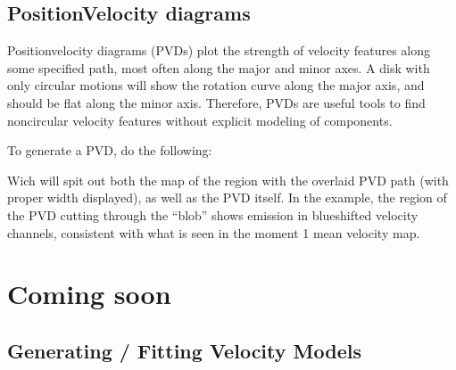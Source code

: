 \documentclass[letterpaper,10pt,english]{sphinxmanual}
\let\sphinxpxdimen\pdfpxdimen\else\newdimen\sphinxpxdimen
\begin{document}
\sphinxstepscope


\section{Position\sphinxhyphen{}Velocity diagrams}
\label{\detokenize{pvds:position-velocity-diagrams}}\label{\detokenize{pvds::doc}}
\sphinxAtStartPar
Position\sphinxhyphen{}velocity diagrams (PVDs) plot the strength of velocity features along some specified path, most often
along the major and minor axes. A disk with only circular motions will show the rotation curve along the
major axis, and should be flat along the minor axis. Therefore, PVDs are useful tools to find non\sphinxhyphen{}circular
velocity features without explicit modeling of components.

\sphinxAtStartPar
To generate a PVD, do the following:

\begin{sphinxVerbatim}[commandchars=\\\{\}]
       
  
\end{sphinxVerbatim}

\sphinxAtStartPar
Wich will spit out both the map of the region with the overlaid PVD path (with proper width displayed), as
well as the PVD itself. In the example, the region of the PVD cutting through the “blob” shows emission in
blue\sphinxhyphen{}shifted velocity channels, consistent with what is seen in the moment 1 mean velocity map.

\noindent\sphinxincludegraphics[width=600\sphinxpxdimen]{{example_pvd}.png}


\chapter{Coming soon}
\label{\detokenize{index:coming-soon}}
\sphinxstepscope


\section{Generating / Fitting Velocity Models}
\label{\detokenize{modeling:generating-fitting-velocity-models}}\label{\detokenize{modeling::doc}}
\end{document}
